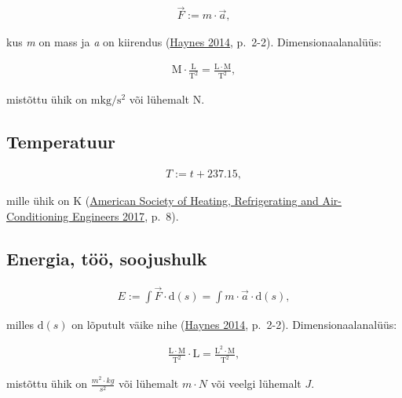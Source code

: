 \documentclass[
  12pt,
  a4paper,
  onecolumn, twoside]{article}
\begin{document}
\begin{align}
\vec{F} := m \cdot \vec{a},
\label{eq:force}
\end{align}

kus \emph{m} on mass ja \emph{a} on kiirendus (\protect\hyperlink{ref-haynes_2014_crc}{Haynes 2014}, p.~2-2). Dimensionaalanalüüs:

\begin{align}
\mathrm{M \cdot \frac{L}{T^2} = \frac{L \cdot M}{T^2}},
\label{eq:dimensional-analysis-for-force}
\end{align}

mistõttu ühik on \(\unit{\meter\kilogram\per\second\squared}\) või lühemalt \(\unit{\newton}\).

\hypertarget{temperatuur}{%
\subsection{Temperatuur}\label{temperatuur}}

\begin{align}
T := t + 237.15,
\label{eq:absolute-temperature}
\end{align}

mille ühik on \(\unit{\kelvin}\) (\protect\hyperlink{ref-American_Society_of_Heating_Refrigerating_and_Air-Conditioning_Engineers2017-im}{American Society of Heating, Refrigerating and Air-Conditioning Engineers 2017}, p.~8).

\hypertarget{energia-tuxf6uxf6-soojushulk}{%
\subsection{Energia, töö, soojushulk}\label{energia-tuxf6uxf6-soojushulk}}

\begin{align}
E := \int{\vec{F}} \cdot \mathrm{d}(s) = \int{m \cdot \vec{a}} \cdot \mathrm{d}(s),
\label{eq:energy}
\end{align}

milles \(\mathrm{d}(s)\) on lõputult väike nihe (\protect\hyperlink{ref-haynes_2014_crc}{Haynes 2014}, p.~2-2). Dimensionaalanalüüs:

\begin{align}
\mathrm{\frac{L \cdot M}{T^2} \cdot L = \frac{L^2 \cdot M}{T^2}},
\label{eq:dimensional-analysis-for-energy}
\end{align}

mistõttu ühik on \(\unit{\frac{m^2 \cdot kg}{s^2}}\) või lühemalt \(\unit{m \cdot N}\) või veelgi lühemalt \(\unit{J}\).
\end{document}
